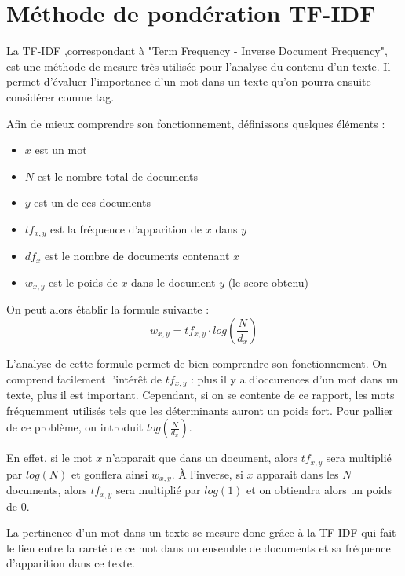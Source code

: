 \section{Méthode de pondération TF-IDF}
La TF-IDF ,correspondant à "Term Frequency - Inverse Document Frequency", est une méthode de mesure très utilisée pour l'analyse du contenu d'un texte. Il permet d'évaluer l'importance d'un mot dans un texte qu'on pourra ensuite considérer comme tag.\par
Afin de mieux comprendre son fonctionnement, définissons quelques éléments :\par
\begin{itemize}
	\item $x$ est un mot
	\item $N$ est le nombre total de documents
	\item $y$ est un de ces documents
	\item $tf_{x, y}$ est la fréquence d'apparition de $x$ dans $y$
	\item $df_{x}$ est le nombre de documents contenant $x$
	\item $w_{x, y}$ est le poids de $x$ dans le document $y$ (le score obtenu)
\end{itemize}
\vspace{0.5cm}
On peut alors établir la formule suivante :
$$w_{x, y}=tf_{x, y} \cdot log(\frac{N}{d_{x}})$$

L'analyse de cette formule permet de bien comprendre son fonctionnement. On comprend facilement l'intérêt de $tf_{x, y}$ : plus il y a d'occurences d'un mot dans un texte, plus il est important. Cependant, si on se contente de ce rapport, les mots fréquemment utilisés tels que les déterminants auront un poids fort.
Pour pallier de ce problème, on introduit $log(\frac{N}{d_{x}})$.\par En effet, si le mot $x$ n'apparait que dans un document, alors $tf_{x, y}$ sera multiplié par $log(N)$ et gonflera ainsi $w_{x, y}$. À l'inverse, si $x$ apparait dans les $N$ documents, alors $tf_{x, y}$ sera multiplié par $log(1)$ et on obtiendra alors un poids de 0.\par
La pertinence d'un mot dans un texte se mesure donc grâce à la TF-IDF qui fait le lien entre la rareté de ce mot dans un ensemble de documents et sa fréquence d'apparition dans ce texte.
